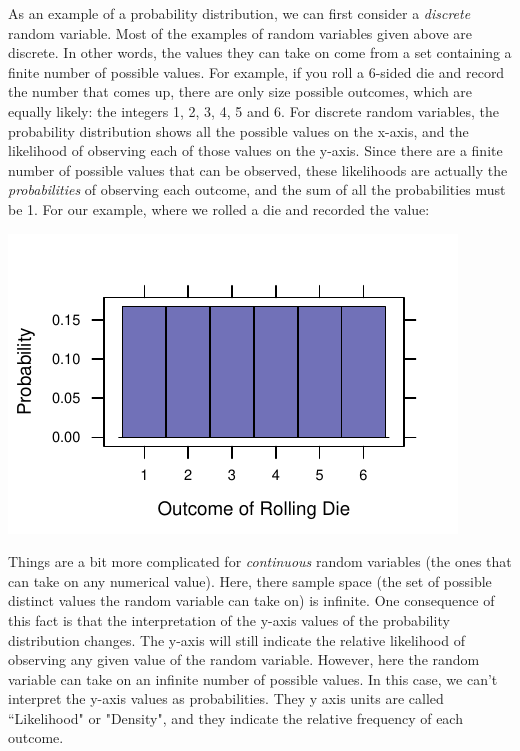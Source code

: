 \documentclass[twoside]{book}\usepackage[]{graphicx}\usepackage[]{xcolor}
\makeatletter
\def\maxwidth{ %
  \ifdim\Gin@nat@width>\linewidth
    \linewidth
  \else
    \Gin@nat@width
  \fi
}
\newenvironment{knitrout}{}{} %
\newcounter{example}[section]
\makeatother
\begin{document}
As an example of a probability distribution, we can first consider a \emph{discrete} random variable.  Most of the examples of random variables given above are discrete. In other words, the values they can take on come from a set containing a finite number of possible values.  For example, if you roll a 6-sided die and record the number that comes up, there are only size possible outcomes, which are equally likely: the integers 1, 2, 3, 4, 5 and 6.  For discrete random variables, the probability distribution shows all the possible values on the x-axis, and the likelihood of observing each of those values on the y-axis.  Since there are a finite number of possible values that can be observed, these likelihoods are actually the \emph{probabilities} of observing each outcome, and the sum of all the probabilities must be 1.  For our example, where we rolled a die and recorded the value:

\begin{knitrout}
\color{fgcolor}

{\centering \includegraphics[width=\maxwidth]{figures/fig-discrete_pmf-1} 

}



\end{knitrout}

Things are a bit more complicated for \emph{continuous} random variables (the ones that can take on any numerical value).  Here, there sample space (the set of possible distinct values the random variable can take on) is infinite.  One consequence of this fact is that the interpretation of the y-axis values of the probability distribution changes.  The y-axis will still indicate the relative likelihood of observing any given value of the random variable.  However, here the random variable can take on an infinite number of possible values.  In this case, we can't interpret the y-axis values as probabilities.  They y axis units are called ``Likelihood" or "Density", and they indicate the relative frequency of each outcome. 
\end{document}
